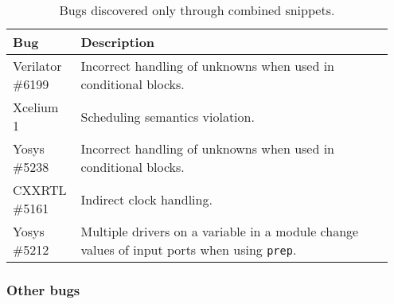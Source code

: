 \begin{table}[t]
    \centering
    \caption{Bugs discovered only through combined snippets.}
    \label{tab:combined-bugs}
    \small
    \begin{tabular}{|P{0.15\linewidth}|p{0.8\linewidth}|}
        \hline
        \textbf{Bug}     & \textbf{Description}                                                                              \\
        \hline

        Verilator \#6199 & Incorrect handling of unknowns when used in conditional blocks.                                   \\
        \hline
        Xcelium 1        & Scheduling semantics violation.                                                                   \\
        \hline
        Yosys \#5238     & Incorrect handling of unknowns when used in conditional blocks.                                   \\
        \hline
        CXXRTL \#5161    & Indirect clock handling.                                                                           \\
        \hline
        Yosys \#5212     & Multiple drivers on a variable in a module change values of input ports when using \texttt{prep}. \\
        \hline
    \end{tabular}
\end{table}

\subsubsection{Other bugs} \label{sec:eval:lesserqualitybugs}

